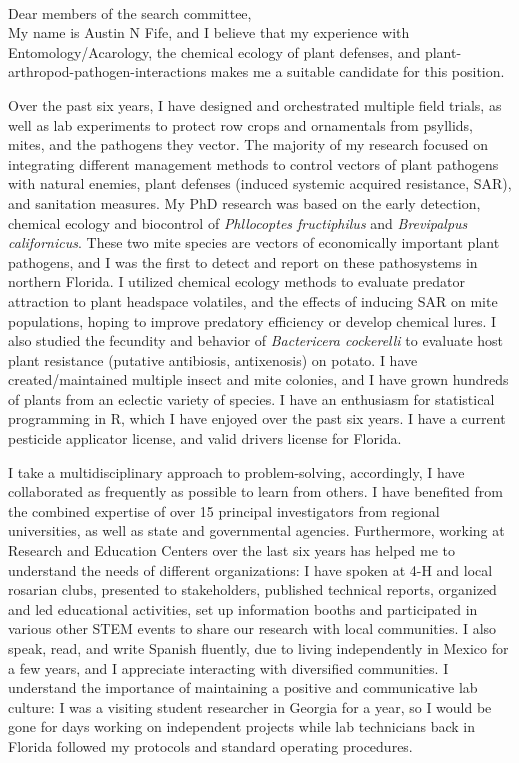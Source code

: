\documentclass[11pt]{letter} %
\begin{document}
\begin{letter}
\\
Dear members of the search committee,\\

My name is Austin N Fife, and I believe that my experience with Entomology/Acarology, the chemical ecology of plant defenses, and plant-arthropod-pathogen-interactions makes me a suitable candidate for this position.

Over the past six years, I have designed and orchestrated multiple field trials, as well as lab experiments to protect row crops and ornamentals from psyllids, mites, and the pathogens they vector. The majority of my research focused on integrating different management methods to control vectors of plant pathogens with natural enemies, plant defenses (induced systemic acquired resistance, SAR), and sanitation measures. My PhD research was based on the early detection, chemical ecology and biocontrol of \textit{Phllocoptes fructiphilus} and \textit{Brevipalpus californicus}. These two mite species are vectors of economically important plant pathogens, and I was the first to detect and report on these pathosystems in northern Florida. I utilized chemical ecology methods to evaluate predator attraction to plant headspace volatiles, and the effects of inducing SAR on mite populations, hoping to improve predatory efficiency or develop chemical lures. I also studied the fecundity and behavior of \textit{Bactericera cockerelli} to evaluate host plant resistance (putative antibiosis, antixenosis) on potato. I have created/maintained multiple insect and mite colonies, and I have grown hundreds of plants from an eclectic variety of species. I have an enthusiasm for statistical programming in R, which I have enjoyed over the past six years. I have a current pesticide applicator license, and valid drivers license for Florida.

I take a multidisciplinary approach to problem-solving, accordingly, I have collaborated as frequently as possible to learn from others. I have benefited from the combined expertise of over 15 principal investigators from regional universities, as well as state and governmental agencies. Furthermore, working at Research and Education Centers over the last six years has helped me to understand the needs of different organizations: I have spoken at 4-H and local rosarian clubs, presented to stakeholders, published technical reports, organized and led educational activities, set up information booths and participated in various other STEM events to share our research with local communities. I also speak, read, and write Spanish fluently, due to living independently in Mexico for a few years, and I appreciate interacting with diversified communities. I understand the importance of maintaining a positive and communicative lab culture: I was a visiting student researcher in Georgia for a year, so I would be gone for days working on independent projects while lab technicians back in Florida followed my protocols and standard operating procedures.


\end{letter}
\end{document}
